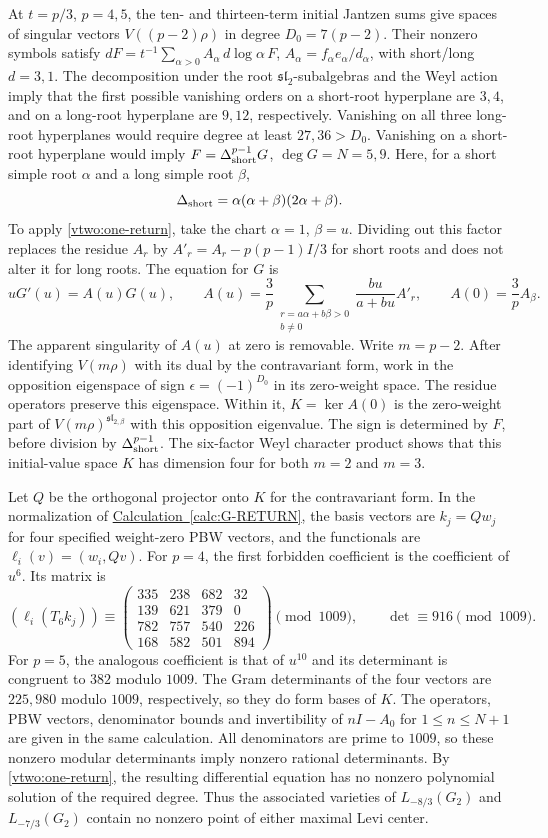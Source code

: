 \documentclass[11pt,a4paper]{amsart}
\numberwithin{equation}{section}
\theoremstyle{definition}
\theoremstyle{remark}
\newcommand{\slg}{\mathfrak{sl}}
\begin{document}
At $t=p/3$, $p=4,5$, the ten- and thirteen-term initial Jantzen sums give
spaces of singular vectors $V((p-2)\rho)$ in degree $D_0=7(p-2)$.
Their nonzero symbols satisfy
$dF=t^{-1}\sum_{\alpha>0}A_\alpha\,d\log\alpha\,F$,
$A_\alpha=f_\alpha e_\alpha/d_\alpha$, with short/long $d=3,1$.
The decomposition under the root $\slg_2$-subalgebras and the Weyl
action imply that the first possible vanishing orders on a short-root
hyperplane are $3,4$, and on a long-root hyperplane are $9,12$,
respectively. Vanishing on all three long-root hyperplanes would
require degree at least $27,36>D_0$. Vanishing on a short-root
hyperplane would imply
$F=\Delta_{\rm short}^{p-1}G$, $\deg G=N=5,9$.
Here, for a short simple root $\alpha$ and a long simple root $\beta$,
$$
 \Delta_{\rm short}=\alpha(\alpha+\beta)(2\alpha+\beta).
$$
To apply \cref{vtwo:one-return}, take the chart $\alpha=1$, $\beta=u$.
Dividing out this factor replaces the residue $A_r$ by
$A'_r=A_r-p(p-1)I/3$ for short roots and does not alter it for
long roots. The equation for $G$ is
$$
 uG'(u)=A(u)G(u),\qquad
 A(u)=\frac3p\sum_{\substack{r=a\alpha+b\beta>0\\b\ne0}}
                   \frac{bu}{a+bu}A'_r,
 \qquad A(0)=\frac3p A_\beta.
$$
The apparent singularity of $A(u)$ at zero is removable.
Write $m=p-2$. After identifying $V(m\rho)$ with its dual by the
contravariant form, work in the opposition eigenspace of sign
$\epsilon=(-1)^{D_0}$ in its zero-weight space. The residue operators
preserve this eigenspace. Within it, $K=\ker A(0)$ is the zero-weight
part of $V(m\rho)^{\slg_{2,\beta}}$ with this opposition eigenvalue.
The sign is determined by $F$, before division
by $\Delta_{\rm short}^{p-1}$. The six-factor Weyl character product
shows that this initial-value space $K$ has dimension four for both
$m=2$ and $m=3$.

Let $Q$ be the orthogonal projector onto $K$ for the contravariant
form. In the normalization of
\hyperref[calc:G-RETURN]{Calculation~\ref*{calc:G-RETURN}}, the basis vectors are
$k_j=Qw_j$ for four specified weight-zero PBW vectors, and the
functionals are $\ell_i(v)=(w_i,Qv)$. For $p=4$, the first forbidden
coefficient is the coefficient of $u^6$. Its matrix is
$$
 (\ell_i(T_6k_j))\equiv
 \begin{pmatrix}
 335&238&682&32\\
 139&621&379&0\\
 782&757&540&226\\
 168&582&501&894
 \end{pmatrix}\pmod {1009},
 \qquad \det\equiv916\pmod {1009}.
$$
For $p=5$, the analogous coefficient is that of $u^{10}$ and its
determinant is congruent to $382$ modulo $1009$.
The Gram determinants of the four vectors are $225,980$ modulo
$1009$, respectively, so they do form bases of $K$.
The operators, PBW vectors, denominator bounds and invertibility
of $nI-A_0$ for $1\le n\le N+1$ are given in the same calculation.
All denominators are prime to $1009$, so these nonzero modular
determinants imply nonzero rational determinants.
By \cref{vtwo:one-return}, the resulting differential equation has no
nonzero polynomial solution of the required degree. Thus the associated
varieties of $L_{-8/3}(G_2)$ and $L_{-7/3}(G_2)$ contain no nonzero
point of either maximal Levi center.
\end{document}
